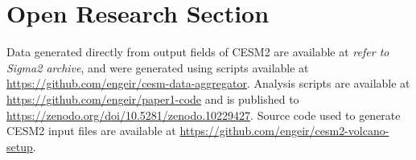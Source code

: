 \documentclass[draft]{agujournal2019}
\begin{document}

%
%

\section*{Open Research Section}


Data generated directly from output fields of CESM2 are available at \emph{refer
  to Sigma2 archive}, and were generated using scripts available at
\url{https://github.com/engeir/cesm-data-aggregator}. Analysis scripts are available at
\url{https://github.com/engeir/paper1-code} and is published to
\url{https://zenodo.org/doi/10.5281/zenodo.10229427}. Source code used to generate
CESM2 input files are available at
\url{https://github.com/engeir/cesm2-volcano-setup}.







\acknowledgments

\end{document}
